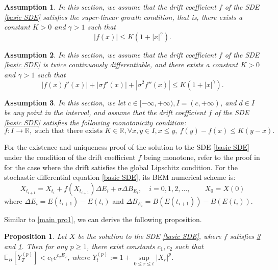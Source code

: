 \documentclass[10pt,reqno,final]{amsart}
\theoremstyle{plain}
\newtheorem{assumption}{Assumption}[section]
\newtheorem{proposition}{Proposition}[section]
\theoremstyle{definition}
\theoremstyle{remark}
\numberwithin{equation}{section}
\numberwithin{figure}{section}
\numberwithin{table}{section}
\begin{document}
\begin{assumption}\label{super linear growth}
	In this section, we assume that the drift coefficient \(f\) of the SDE \cref{basic SDE} satisfies the super-linear growth condition, that is, there exists a constant \(K > 0\) and \(\gamma > 1\) such that
	\begin{equation}
		|f(x)| \le K(1+|x|^{\gamma}).
	\end{equation}
\end{assumption}

\begin{assumption}\label{momentBEM}
	In this section, we assume that the drift coefficient \(f\) of the SDE \cref{basic SDE} is twice continuously differentiable, and there exists a constant \(K > 0\) and \(\gamma > 1\) such that
	\begin{equation}
		|f(x)f'(x)| + |\sigma f'(x)| + |\sigma^2 f''(x)| \leq K(1 + |x|^{\gamma}).
	\end{equation}
\end{assumption}

\begin{assumption}\label{monotony}
	In this section, we let \(c \in [-\infty,+\infty), I = (c, +\infty)\), and \(d \in I\) be any point in the interval, and assume that the drift coefficient \( f \) of the SDE \cref{basic SDE} satisfies the following monotonicity condition:
	\begin{equation}
		f: I \to \mathbb{R}, \text{ such that there exists } K \in \mathbb{R}, \forall x, y \in I, x \leq y, \ f(y) - f(x) \leq K(y - x).
	\end{equation}
\end{assumption}


For the existence and uniqueness proof of the solution to the SDE \cref{basic SDE} under the condition of the drift coefficient \(f\) being monotone, refer to the proof in \cite{umarov2018beyond} for the case where the drift satisfies the global Lipschitz condition. For the stochastic differential equation \cref{basic SDE}, its BEM numerical scheme is:
\begin{equation}\label{eq:1}
	X_{t_{i+1}} = X_{t_i} + f(X_{t_{i+1}}) \Delta E_i + \sigma \Delta B_{E_i}, \quad i = 0, 1, 2, \ldots, \qquad X_0 = X(0)
\end{equation}
where \( \Delta E_i = E(t_{i+1}) - E(t_i) \) and \( \Delta B_{E_i} = B(E(t_{i+1})) - B(E(t_i)) \).

Similar to \cref{main pro1}, we can derive the following proposition.
\begin{proposition}\label{main pro2}
	Let $X$ be the solution to the SDE \cref{basic SDE}, where $f$ satisfies \cref{monotony} and \cref{super linear growth}. Then for any $p \ge 1$, there exist constants $c_1, c_2$ such that $\mathbb{E}_{B}[Y_T^{(p)}] < c_1 e^{c_2E_T }$, where $Y_t^{(p)} := 1 + \sup\limits_{0 \le r \le t} |X_r|^p$.
\end{proposition}
\end{document}
